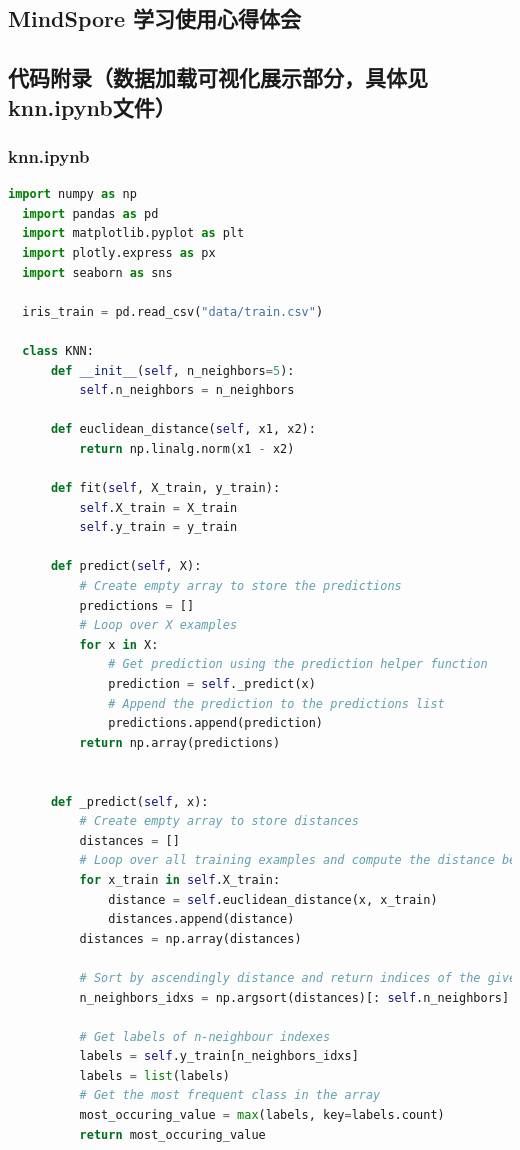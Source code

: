 \documentclass[12pt]{article}
\begin{document}
\subsection{MindSpore 学习使用心得体会}

\subsection{代码附录（数据加载可视化展示部分，具体见knn.ipynb文件）}
\subsubsection{knn.ipynb}
\begin{lstlisting}[language=Python]
  import numpy as np
  import pandas as pd
  import matplotlib.pyplot as plt
  import plotly.express as px
  import seaborn as sns
  
  iris_train = pd.read_csv("data/train.csv") 
  
  class KNN:
      def __init__(self, n_neighbors=5):
          self.n_neighbors = n_neighbors
          
      def euclidean_distance(self, x1, x2):
          return np.linalg.norm(x1 - x2)
  
      def fit(self, X_train, y_train):
          self.X_train = X_train
          self.y_train = y_train
  
      def predict(self, X):
          # Create empty array to store the predictions
          predictions = []
          # Loop over X examples
          for x in X:
              # Get prediction using the prediction helper function
              prediction = self._predict(x)
              # Append the prediction to the predictions list
              predictions.append(prediction)
          return np.array(predictions)
      
  
      def _predict(self, x):
          # Create empty array to store distances
          distances = []
          # Loop over all training examples and compute the distance between x and all the training examples 
          for x_train in self.X_train:
              distance = self.euclidean_distance(x, x_train)
              distances.append(distance)
          distances = np.array(distances)
          
          # Sort by ascendingly distance and return indices of the given n neighbours
          n_neighbors_idxs = np.argsort(distances)[: self.n_neighbors]
          
          # Get labels of n-neighbour indexes
          labels = self.y_train[n_neighbors_idxs]                  
          labels = list(labels)
          # Get the most frequent class in the array
          most_occuring_value = max(labels, key=labels.count)
          return most_occuring_value
      

\end{lstlisting}
\end{document}
